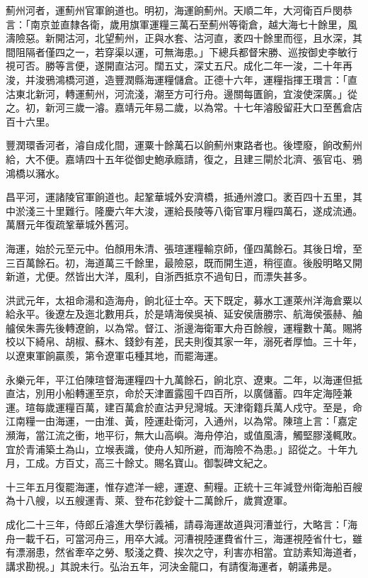 薊州河者，運薊州官軍餉道也。明初，海運餉薊州。天順二年，大河衛百戶閔恭言：「南京並直隸各衛，歲用旗軍運糧三萬石至薊州等衛倉，越大海七十餘里，風濤險惡。新開沽河，北望薊州，正與水套、沽河直，袤四十餘里而徑，且水深，其間阻隔者僅四之一，若穿渠以運，可無海患。」下總兵都督宋勝、巡按御史李敏行視可否。勝等言便，遂開直沽河。闊五丈，深丈五尺。成化二年一浚，二十年再浚，并浚鴉鴻橋河道，造豐潤縣海運糧儲倉。正德十六年，運糧指揮王瓚言：「直沽東北新河，轉運薊州，河流淺，潮至方可行舟。邊關每匱餉，宜浚使深廣。」從之。初，新河三歲一濬。嘉靖元年易二歲，以為常。十七年濬殷留莊大口至舊倉店百十六里。

豐潤環香河者，濬自成化間，運粟十餘萬石以餉薊州東路者也。後堙廢，餉改薊州給，大不便。嘉靖四十五年從御史鮑承廕請，復之，且建三閘於北濟、張官屯、鴉鴻橋以瀦水。

昌平河，運諸陵官軍餉道也。起鞏華城外安濟橋，抵通州渡口。袤百四十五里，其中淤淺三十里難行。隆慶六年大浚，運給長陵等八衛官軍月糧四萬石，遂成流通。萬曆元年復疏鞏華城外舊河。

海運，始於元至元中。伯顏用朱清、張瑄運糧輸京師，僅四萬餘石。其後日增，至三百萬餘石。初，海道萬三千餘里，最險惡，既而開生道，稍徑直。後殷明略又開新道，尤便。然皆出大洋，風利，自浙西抵京不過旬日，而漂失甚多。

洪武元年，太祖命湯和造海舟，餉北征士卒。天下既定，募水工運萊州洋海倉粟以給永平。後遼左及迤北數用兵，於是靖海侯吳禎、延安侯唐勝宗、航海侯張赫、舳艫侯朱壽先後轉遼餉，以為常。督江、浙邊海衛軍大舟百餘艘，運糧數十萬。賜將校以下綺帛、胡椒、蘇木、錢鈔有差，民夫則復其家一年，溺死者厚恤。三十年，以遼東軍餉贏羨，第令遼軍屯種其地，而罷海運。

永樂元年，平江伯陳瑄督海運糧四十九萬餘石，餉北京、遼東。二年，以海運但抵直沽，別用小船轉運至京，命於天津置露囤千四百所，以廣儲蓄。四年定海陸兼運。瑄每歲運糧百萬，建百萬倉於直沽尹兒灣城。天津衛籍兵萬人戍守。至是，命江南糧一由海運，一由淮、黃，陸運赴衛河，入通州，以為常。陳瑄上言：「嘉定瀕海，當江流之衝，地平衍，無大山高嶼。海舟停泊，或值風濤，觸堅膠淺輒敗。宜於青浦築土為山，立堠表識，使舟人知所避，而海險不為患。」詔從之。十年九月，工成。方百丈，高三十餘丈。賜名寶山。御製碑文紀之。

十三年五月復罷海運，惟存遮洋一總，運遼、薊糧。正統十三年減登州衛海船百艘為十八艘，以五艘運青、萊、登布花鈔錠十二萬餘斤，歲賞遼軍。

成化二十三年，侍郎丘濬進大學衍義補，請尋海運故道與河漕並行，大略言：「海舟一載千石，可當河舟三，用卒大減。河漕視陸運費省什三，海運視陸省什七，雖有漂溺患，然省牽卒之勞、駁淺之費、挨次之守，利害亦相當。宜訪素知海道者，講求勘視。」其說未行。弘治五年，河決金龍口，有請復海運者，朝議弗是。

